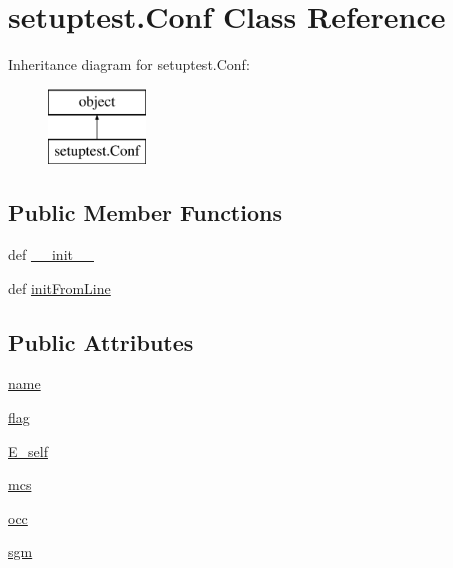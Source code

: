 \hypertarget{classsetuptest_1_1_conf}{\section{setuptest.\-Conf Class Reference}
\label{classsetuptest_1_1_conf}
}
Inheritance diagram for setuptest.\-Conf\-:\begin{figure}[H]
\begin{center}
\leavevmode
\includegraphics[height=2.000000cm]{classsetuptest_1_1_conf}
\end{center}
\end{figure}
\subsection*{Public Member Functions}
\begin{DoxyCompactItemize}
\item 
def \hyperlink{classsetuptest_1_1_conf_a48fc1bcd9f7cbd067e879a36a9f4c35f}{\-\_\-\-\_\-init\-\_\-\-\_\-}
\item 
def \hyperlink{classsetuptest_1_1_conf_ab7499595f3507bae83ffdbdba335f0c6}{init\-From\-Line}
\end{DoxyCompactItemize}
\subsection*{Public Attributes}
\begin{DoxyCompactItemize}
\item 
\hyperlink{classsetuptest_1_1_conf_a452e948db88329edca628da42df7efa4}{name}
\item 
\hyperlink{classsetuptest_1_1_conf_a11548ab44fdc3b46377a905ac60407c4}{flag}
\item 
\hyperlink{classsetuptest_1_1_conf_a986003b2244aef6dfb9f691bda3719e5}{E\-\_\-self}
\item 
\hyperlink{classsetuptest_1_1_conf_aa03d2c623ea2025ce30627696a2c89dd}{mcs}
\item 
\hyperlink{classsetuptest_1_1_conf_aa0a737a680ff2ce3e2ecd1a1f2611dd0}{occ}
\item 
\hyperlink{classsetuptest_1_1_conf_adb6b4cbd0a0cefeaa6618ed939240d47}{sgm}
\end{DoxyCompactItemize}


